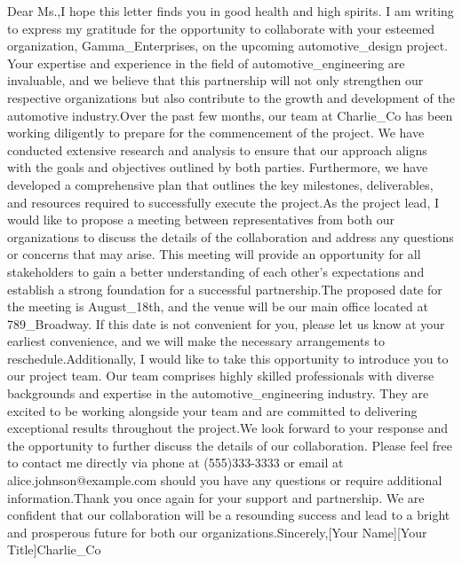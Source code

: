Dear Ms.,I hope this letter finds you in good health and high spirits. I am writing to express my gratitude for the opportunity to collaborate with your esteemed organization, Gamma_Enterprises, on the upcoming automotive_design project. Your expertise and experience in the field of automotive_engineering are invaluable, and we believe that this partnership will not only strengthen our respective organizations but also contribute to the growth and development of the automotive industry.Over the past few months, our team at Charlie_Co has been working diligently to prepare for the commencement of the project. We have conducted extensive research and analysis to ensure that our approach aligns with the goals and objectives outlined by both parties. Furthermore, we have developed a comprehensive plan that outlines the key milestones, deliverables, and resources required to successfully execute the project.As the project lead, I would like to propose a meeting between representatives from both our organizations to discuss the details of the collaboration and address any questions or concerns that may arise. This meeting will provide an opportunity for all stakeholders to gain a better understanding of each other's expectations and establish a strong foundation for a successful partnership.The proposed date for the meeting is August_18th, and the venue will be our main office located at 789_Broadway. If this date is not convenient for you, please let us know at your earliest convenience, and we will make the necessary arrangements to reschedule.Additionally, I would like to take this opportunity to introduce you to our project team. Our team comprises highly skilled professionals with diverse backgrounds and expertise in the automotive_engineering industry. They are excited to be working alongside your team and are committed to delivering exceptional results throughout the project.We look forward to your response and the opportunity to further discuss the details of our collaboration. Please feel free to contact me directly via phone at (555)333-3333 or email at alice.johnson@example.com should you have any questions or require additional information.Thank you once again for your support and partnership. We are confident that our collaboration will be a resounding success and lead to a bright and prosperous future for both our organizations.Sincerely,[Your Name][Your Title]Charlie_Co